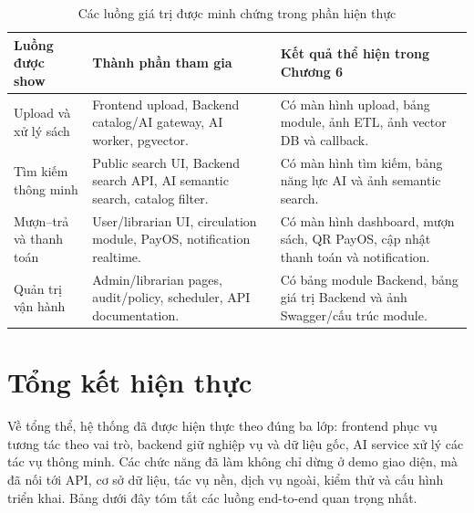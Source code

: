 \begin{table}[H]
\centering
\small
\begin{tabularx}{\textwidth}{|p{3.4cm}|p{5.6cm}|X|}
\hline
\textbf{Luồng được show} & \textbf{Thành phần tham gia} & \textbf{Kết quả thể hiện trong Chương 6} \\
\hline
Upload và xử lý sách &
Frontend upload, Backend catalog/AI gateway, AI worker, pgvector. &
Có màn hình upload, bảng module, ảnh ETL, ảnh vector DB và callback. \\
\hline
Tìm kiếm thông minh &
Public search UI, Backend search API, AI semantic search, catalog filter. &
Có màn hình tìm kiếm, bảng năng lực AI và ảnh semantic search. \\
\hline
Mượn--trả và thanh toán &
User/librarian UI, circulation module, PayOS, notification realtime. &
Có màn hình dashboard, mượn sách, QR PayOS, cập nhật thanh toán và notification. \\
\hline
Quản trị vận hành &
Admin/librarian pages, audit/policy, scheduler, API documentation. &
Có bảng module Backend, bảng giá trị Backend và ảnh Swagger/cấu trúc module. \\
\hline
\end{tabularx}
\caption{Các luồng giá trị được minh chứng trong phần hiện thực}
\label{tab:implementation_value_flows}
\end{table}

\section{Tổng kết hiện thực}

Về tổng thể, hệ thống đã được hiện thực theo đúng ba lớp: frontend phục vụ tương
tác theo vai trò, backend giữ nghiệp vụ và dữ liệu gốc, AI service xử lý các tác
vụ thông minh. Các chức năng đã làm không chỉ dừng ở demo giao diện, mà đã nối
tới API, cơ sở dữ liệu, tác vụ nền, dịch vụ ngoài, kiểm thử và cấu hình triển
khai. Bảng dưới đây tóm tắt các luồng end-to-end quan trọng nhất.

